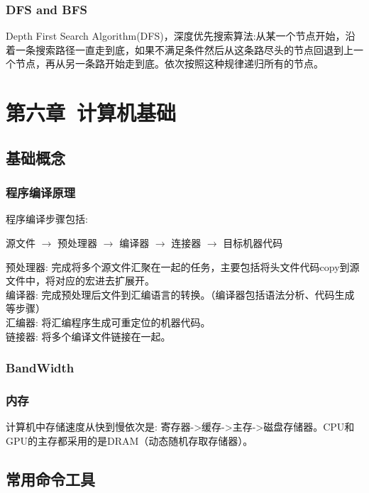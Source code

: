 \documentclass[12pt]{book}
\begin{document}
\subsection{DFS and BFS}
Depth First Search Algorithm(DFS)，深度优先搜索算法:从某一个节点开始，沿着一条搜索路径一直走到底，如果不满足条件然后从这条路尽头的节点回退到上一个节点，再从另一条路开始走到底。依次按照这种规律递归所有的节点。

\newpage

\fancyhead{}

\chapter{第六章\ 计算机基础}
\section{基础概念}
\subsection{程序编译原理}
程序编译步骤包括:
 \begin{center} 源文件 $\rightarrow$ 预处理器 $\rightarrow$ 编译器 $\rightarrow$ 连接器 $\rightarrow$ 目标机器代码 \end{center}
预处理器: 完成将多个源文件汇聚在一起的任务，主要包括将头文件代码copy到源文件中，将对应的宏进去扩展开。\\
编译器: 完成预处理后文件到汇编语言的转换。（编译器包括语法分析、代码生成等步骤）\\
汇编器: 将汇编程序生成可重定位的机器代码。\\
链接器: 将多个编译文件链接在一起。\\
\subsection{BandWidth}

\subsection{内存}
计算机中存储速度从快到慢依次是: 寄存器->缓存->主存->磁盘存储器。CPU和GPU的主存都采用的是DRAM（动态随机存取存储器）。

\section{常用命令工具}
\end{document}
